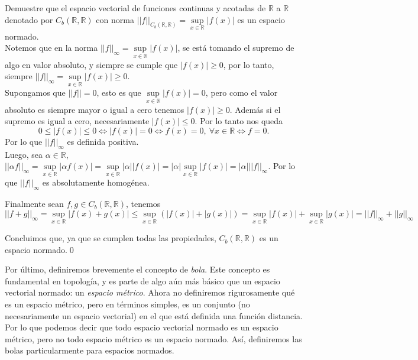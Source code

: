 \documentclass[12pt]{book}
\begin{document}
\begin{exampleenv}

Demuestre que el espacio vectorial de funciones continuas y acotadas de $\mathbb{R}$ a $\mathbb{R}$ denotado por $C_b(\mathbb{R},\mathbb{R})$ con norma $||f||_{C_b(\mathbb{R},\mathbb{R})}=\sup\limits_{x\in\mathbb{R}} |f(x)|$ es un espacio normado.\\

Notemos que en la norma $||f||_\infty=\sup\limits_{x\in\mathbb{R}} |f(x)|$, se está tomando el supremo de algo en valor absoluto, y siempre se cumple que $|f(x)|\ge0$, por lo tanto, siempre $||f||_\infty=\sup\limits_{x\in\mathbb{R}} |f(x)|\ge0$.\\

Supongamos que $||f||=0$, esto es que $\sup\limits_{x\in\mathbb{R}} |f(x)|=0$, pero como el valor absoluto es siempre mayor o igual a cero tenemos $|f(x)|\ge0$. Además si el supremo es igual a cero, necesariamente $|f(x)|\leq 0$. Por lo tanto nos queda
\[
    0\leq |f(x)|\leq0 \iff |f(x)|=0\iff f(x)=0,\ \forall x\in \mathbb{R} \iff f=0.
\]
Por lo que $||f||_\infty$ es definida positiva.\\

Luego, sea $\alpha\in \mathbb{R}$, $||\alpha f||_\infty=\sup\limits_{x\in\mathbb{R}} |\alpha f(x)|=\sup\limits_{x\in\mathbb{R}} |\alpha||f(x)|=|\alpha|\sup\limits_{x\in\mathbb{R}} |f(x)|=|\alpha|||f||_\infty$. Por lo que $||f||_\infty$ es absolutamente homogénea.

Finalmente sean $f,g\in C_b(\mathbb{R}, \mathbb{R})$, tenemos
\[
    ||f+g||_\infty=\sup\limits_{x\in\mathbb{R}} |f(x)+g(x)|\leq \sup\limits_{x\in\mathbb{R}} (|f(x)|+|g(x)|)=\sup\limits_{x\in\mathbb{R}} |f(x)|+\sup\limits_{x\in\mathbb{R}} |g(x)|=||f||_\infty+||g||_\infty
\]

Concluimos que, ya que se cumplen todas las propiedades, $C_b(\mathbb{R},\mathbb{R})$ es un espacio normado.\qed
\end{exampleenv}

Por último, definiremos brevemente el concepto de \textit{bola}. Este concepto es fundamental en topología, y es parte de algo aún más básico que un espacio vectorial normado: un \textit{espacio métrico}. Ahora no definiremos rigurosamente qué es un espacio métrico, pero en términos simples, es un conjunto (no necesariamente un espacio vectorial) en el que está definida una función distancia. Por lo que podemos decir que todo espacio vectorial normado es un espacio métrico, pero no todo espacio métrico es un espacio normado. Así, definiremos las bolas particularmente para espacios normados.
\end{document}
